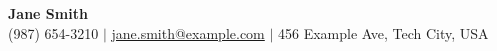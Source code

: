 \begin{center}
    {\fontsize{20}{24}\selectfont\textbf{Jane Smith}} \\
    \vspace{3pt}
    \small
    (987) 654-3210 $|$ \href{mailto:jane.smith@example.com}{jane.smith@example.com} $|$ 456 Example Ave, Tech City, USA
\end{center}

